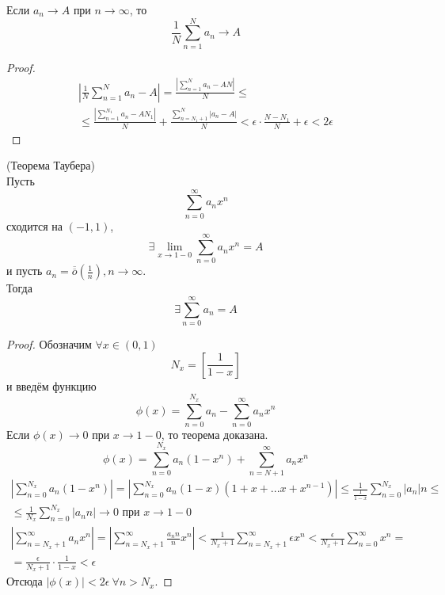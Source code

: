 \begin{lemma}
    Если $a_n \rightarrow A$ при $n \rightarrow \infty$, то
    \[\frac{1}{N}\sum_{n=1}^{N}a_n \rightarrow A\]
\end{lemma}
\begin{proof}
    \begin{multline*}
        \left|\frac{1}{N}\sum_{n=1}^{N}a_n - A\right| = \frac{\left|\sum\limits_{n=1}^{N}a_n - AN\right|}{N}\leq \\
        \leq \frac{\left|\sum\limits_{n=1}^{N_1}a_n - AN_1\right|}{N}+\frac{\sum\limits_{n=N_1+1}^{N}|a_n - A|}{N} < \epsilon\cdot \frac{N-N_1}{N} + \epsilon < 2\epsilon
    \end{multline*}
\end{proof}
\begin{theorem}(Теорема Таубера)\\
    Пусть
    \[\sum_{n=0}^{\infty}a_n x^n\]
    сходится на $(-1, 1)$,
    \[\exists \lim \limits_{x\rightarrow 1-0} \sum_{n=0}^{\infty}a_n x^n = A\]
    и пусть $a_n = \overline{\overline{o}}(\frac{1}{n}), n \rightarrow \infty$.\\
    Тогда 
    \[\exists \sum_{n=0}^{\infty}a_n = A\]
\end{theorem}
\begin{proof}
    Обозначим $\forall x \in (0, 1)$
    \[N_x = \left[\frac{1}{1-x}\right]\]
    и введём функцию
    \[\phi(x) = \sum_{n=0}^{N_x}a_n - \sum_{n=0}^{\infty}a_n x^n\]
    Если $\phi(x) \rightarrow 0$ при $x \rightarrow 1-0$, то теорема доказана.
    \[\phi(x) = \sum_{n=0}^{N_x}a_n(1-x^n) + \sum_{n=N+1}^{\infty}a_n x^n\]
    \begin{multline*}
        \left|\sum_{n=0}^{N_x}a_n(1-x^n)\right| = \left|\sum_{n=0}^{N_x}a_n(1-x)(1+x+...x+x^{n-1})\right| \leq \frac{1}{\frac{1}{1-x}}\sum_{n=0}^{N_x}|a_n|n \leq \\ 
        \leq \frac{1}{N_x}\sum_{n=0}^{N_x}|a_nn| \rightarrow 0 \text{ при } x \rightarrow 1-0
    \end{multline*}
    \begin{multline*}
        \left|\sum_{n=N_x+1}^{\infty}a_n x^n\right| = \left|\sum_{n=N_x+1}^{\infty}\frac{a_n n}{n} x^n \right| < \frac{1}{N_x + 1}\sum_{n=N_x+1}^{\infty}\epsilon x^n < \frac{\epsilon}{N_x + 1}\sum_{n=0}^{\infty}x^n =\\= \frac{\epsilon}{N_x + 1} \cdot \frac{1}{1-x} < \epsilon
    \end{multline*}
    Отсюда $|\phi(x)| < 2\epsilon \ \forall n > N_x$.
\end{proof}
